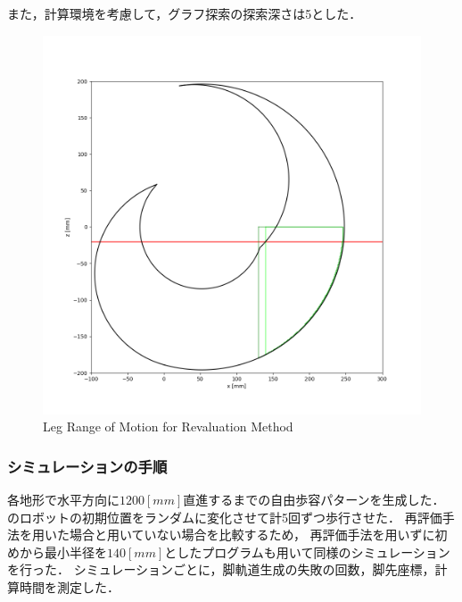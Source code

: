 また，計算環境を考慮して，グラフ探索の探索深さは5とした．

\begin{figure}[htbp]
  \centering
  \includegraphics[width=0.5\linewidth,trim={30 30 30 30}, clip]{figure/chapter4/revaluation_view.png}
  \caption{Leg Range of Motion for Revaluation Method}
  \label{fig:ch5_range_revaluation} %
\end{figure}

\subsubsection{シミュレーションの手順}
各地形で水平方向に$1200 [mm]$直進するまでの自由歩容パターンを生成した．
のロボットの初期位置をランダムに変化させて計5回ずつ歩行させた．
再評価手法を用いた場合と用いていない場合を比較するため，
再評価手法を用いずに初めから最小半径を$140 [mm]$としたプログラムも用いて同様のシミュレーションを行った．
シミュレーションごとに，脚軌道生成の失敗の回数，脚先座標，計算時間を測定した．
\\

